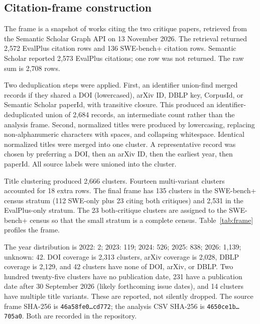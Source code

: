 \documentclass[11pt,a4paper]{article}
\begin{document}
\subsection{Citation-frame construction}

The frame is a snapshot of works citing the two critique papers, retrieved from the Semantic Scholar Graph API on 13 November 2026. The retrieval returned 2,572 EvalPlus citation rows and 136 SWE-bench+ citation rows. Semantic Scholar reported 2,573 EvalPlus citations; one row was not returned. The raw sum is 2,708 rows.

Two deduplication steps were applied. First, an identifier union-find merged records if they shared a DOI (lowercased), arXiv ID, DBLP key, CorpusId, or Semantic Scholar paperId, with transitive closure. This produced an identifier-deduplicated union of 2,684 records, an intermediate count rather than the analysis frame. Second, normalized titles were produced by lowercasing, replacing non-alphanumeric characters with spaces, and collapsing whitespace. Identical normalized titles were merged into one cluster. A representative record was chosen by preferring a DOI, then an arXiv ID, then the earliest year, then paperId. All source labels were unioned into the cluster.

Title clustering produced 2,666 clusters. Fourteen multi-variant clusters accounted for 18 extra rows. The final frame has 135 clusters in the SWE-bench+ census stratum (112 SWE-only plus 23 citing both critiques) and 2,531 in the EvalPlus-only stratum. The 23 both-critique clusters are assigned to the SWE-bench+ census so that the small stratum is a complete census. Table~\ref{tab:frame} profiles the frame.

The year distribution is 2022: 2; 2023: 119; 2024: 526; 2025: 838; 2026: 1,139; unknown: 42. DOI coverage is 2,313 clusters, arXiv coverage is 2,028, DBLP coverage is 2,129, and 42 clusters have none of DOI, arXiv, or DBLP. Two hundred twenty-five clusters have no publication date, 231 have a publication date after 30 September 2026 (likely forthcoming issue dates), and 14 clusters have multiple title variants. These are reported, not silently dropped. The source frame SHA-256 is \texttt{46a58fe0\ldots cd772}; the analysis CSV SHA-256 is \texttt{4650ce1b\ldots 705a0}. Both are recorded in the repository.
\end{document}

